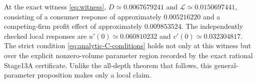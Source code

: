 At the exact witness \eqref{eq:witness},
$D\simeq0.0067679241$ and
$\mathcal L\simeq0.0150697441$, consisting of
a consumer response of approximately $0.005216220$
and a competing-firm profit effect of approximately
$0.009853524$. The independently checked local responses
are $u'(0)\simeq0.060810232$ and
$v'(0)\simeq0.032304817$.
The strict condition \eqref{eq:analytic-C-conditions}
holds not only at this witness but over the
explicit nonzero-volume parameter region
recorded by the exact rational Stage13A certificate.
Unlike the all-depth theorem that follows, this
general-parameter proposition makes only a local claim.
